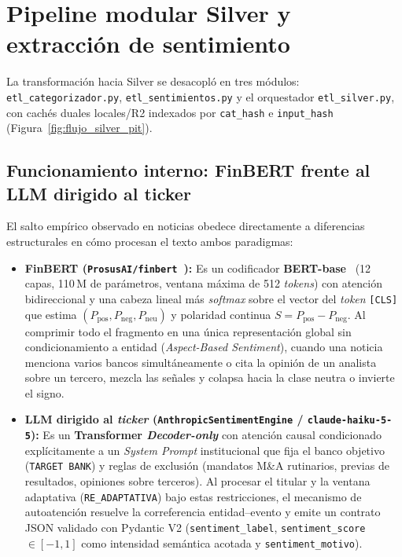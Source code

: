 \section{Pipeline modular Silver y extracción de sentimiento}
La transformación hacia Silver se desacopló en tres módulos: \texttt{etl\_categorizador.py}, \texttt{etl\_sentimientos.py} y el orquestador \texttt{etl\_silver.py}, con cachés duales locales/R2 indexados por \texttt{cat\_hash} e \texttt{input\_hash} (Figura~\ref{fig:flujo_silver_pit}).

\subsection{Funcionamiento interno: FinBERT frente al LLM dirigido al ticker}
El salto empírico observado en noticias obedece directamente a diferencias estructurales en cómo procesan el texto ambos paradigmas:

\begin{itemize}
    \item \textbf{FinBERT (\texttt{ProsusAI/finbert}~\cite{araci2019finbert}):} Es un codificador \textbf{BERT-base}~\cite{devlin2019bert} (12 capas, 110\,M de parámetros, ventana máxima de 512 \textit{tokens}) con atención bidireccional y una cabeza lineal más \textit{softmax} sobre el vector del \textit{token} \texttt{[CLS]} que estima $(P_{\text{pos}}, P_{\text{neg}}, P_{\text{neu}})$ y polaridad continua $S = P_{\text{pos}} - P_{\text{neg}}$. Al comprimir todo el fragmento en una única representación global sin condicionamiento a entidad (\textit{Aspect-Based Sentiment}), cuando una noticia menciona varios bancos simultáneamente o cita la opinión de un analista sobre un tercero, mezcla las señales y colapsa hacia la clase neutra o invierte el signo.
    \item \textbf{LLM dirigido al \textit{ticker} (\texttt{AnthropicSentimentEngine} / \texttt{claude-\allowbreak haiku-5-5}):} Es un \textbf{Transformer \textit{Decoder-only}} con atención causal condicionado explícitamente a un \textit{System Prompt} institucional que fija el banco objetivo (\texttt{TARGET BANK}) y reglas de exclusión (mandatos M\&A rutinarios, previas de resultados, opiniones sobre terceros). Al procesar el titular y la ventana adaptativa (\texttt{RE\_ADAPTATIVA}) bajo estas restricciones, el mecanismo de autoatención resuelve la correferencia entidad--evento y emite un contrato JSON validado con Pydantic V2 (\texttt{sentiment\_label}, \texttt{sentiment\_score} $\in [-1, 1]$ como intensidad semántica acotada y \texttt{sentiment\_motivo}).
\end{itemize}

